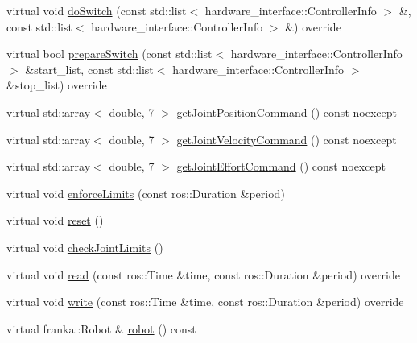 \begin{DoxyCompactItemize}
\item 
virtual void \hyperlink{classfranka__hw_1_1_franka_h_w_ab29812769471d212a30dac6c19c12884}{do\+Switch} (const std\+::list$<$ hardware\+\_\+interface\+::\+Controller\+Info $>$ \&, const std\+::list$<$ hardware\+\_\+interface\+::\+Controller\+Info $>$ \&) override
\item 
virtual bool \hyperlink{classfranka__hw_1_1_franka_h_w_ab73b14d5f8481cd3cb3d670aeae2de06}{prepare\+Switch} (const std\+::list$<$ hardware\+\_\+interface\+::\+Controller\+Info $>$ \&start\+\_\+list, const std\+::list$<$ hardware\+\_\+interface\+::\+Controller\+Info $>$ \&stop\+\_\+list) override
\item 
virtual std\+::array$<$ double, 7 $>$ \hyperlink{classfranka__hw_1_1_franka_h_w_a80bc3da19575532ab827bc9c62f91bed}{get\+Joint\+Position\+Command} () const noexcept
\item 
virtual std\+::array$<$ double, 7 $>$ \hyperlink{classfranka__hw_1_1_franka_h_w_a93067ec2c8ba530188ee70f024ddf100}{get\+Joint\+Velocity\+Command} () const noexcept
\item 
virtual std\+::array$<$ double, 7 $>$ \hyperlink{classfranka__hw_1_1_franka_h_w_ae8063f56d7e70e0f7537fe1d522f8f2f}{get\+Joint\+Effort\+Command} () const noexcept
\item 
virtual void \hyperlink{classfranka__hw_1_1_franka_h_w_afb0f49fec764be80e4c89e29706a4936}{enforce\+Limits} (const ros\+::\+Duration \&period)
\item 
virtual void \hyperlink{classfranka__hw_1_1_franka_h_w_aaa0bc020099cb6dba41728252d0c7df4}{reset} ()
\item 
virtual void \hyperlink{classfranka__hw_1_1_franka_h_w_a120261c13cfa7f508061dd5c81d080e5}{check\+Joint\+Limits} ()
\item 
virtual void \hyperlink{classfranka__hw_1_1_franka_h_w_a8494bbab229cd16bc9bb7c994b01684d}{read} (const ros\+::\+Time \&time, const ros\+::\+Duration \&period) override
\item 
virtual void \hyperlink{classfranka__hw_1_1_franka_h_w_afcdec49ec8bb07c48ed3d77ea2cd4e46}{write} (const ros\+::\+Time \&time, const ros\+::\+Duration \&period) override
\item 
virtual franka\+::\+Robot \& \hyperlink{classfranka__hw_1_1_franka_h_w_ade38eaa271d71cebb8bce3635cf82169}{robot} () const
\end{DoxyCompactItemize}
